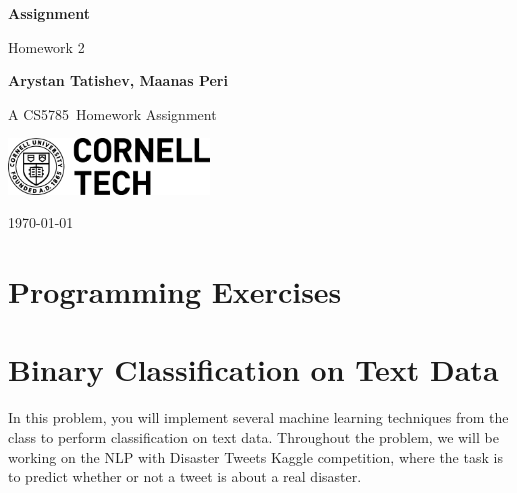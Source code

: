 \documentclass[10pt, a4paper]{article}
\newcommand\course{CS5785}                            %
\newcommand\hwnumber{2}                                 %
\newcommand\Information{Arystan Tatishev, Maanas Peri}                        %
\begin{document}
\begin{titlepage}
    \begin{center}
        \vspace*{3cm}
            
        \Huge
        \textbf{Assignment}
            
        \vspace{1cm}
        \huge
        Homework \hwnumber
            
        \vspace{1.5cm}
        \Large
            
        \textbf{\Information}                      %
        
            
        \vfill
        
        A \course \ Homework Assignment
            
        \vspace{1cm}
            
        \includegraphics[width=0.4\textwidth]{logo-ct.png}
        \\
        
        \Large
        
        \today
            
    \end{center}
\end{titlepage}

\newpage
\section*{Programming Exercises}
\section*{Binary Classification on Text Data}
\begin{Problem}
In this problem, you will implement several machine learning techniques from the class to perform classification on text data. Throughout the problem, we will be working on the NLP with Disaster Tweets Kaggle competition, where the task is to predict whether or not a tweet is about a real disaster.
\end{Problem}
\end{document}
